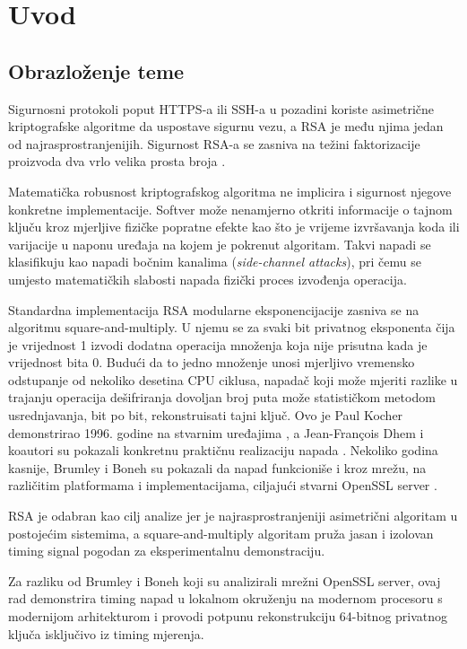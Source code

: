 
\chapter{Uvod}
\label{ch:uvod}

\section{Obrazloženje teme}
\label{sec:obrazlozenje}

Sigurnosni protokoli poput HTTPS-a ili SSH-a u pozadini koriste asimetrične kriptografske algoritme da uspostave sigurnu vezu, a RSA je među njima jedan od najrasprostranjenijih. Sigurnost RSA-a se zasniva na težini faktorizacije proizvoda dva vrlo velika prosta broja \cite{rivest1978}.

Matematička robusnost kriptografskog algoritma ne implicira i sigurnost njegove konkretne implementacije. Softver može nenamjerno otkriti informacije o tajnom ključu kroz mjerljive fizičke popratne efekte kao što je vrijeme izvršavanja koda ili varijacije u naponu uređaja na kojem je pokrenut algoritam. Takvi napadi se klasifikuju kao napadi bočnim kanalima (\textit{side-channel attacks}), pri čemu se umjesto matematičkih slabosti napada fizički proces izvođenja operacija.

Standardna implementacija RSA modularne eksponencijacije zasniva se na algoritmu square-and-multiply. U njemu se za svaki bit privatnog eksponenta čija je vrijednost 1 izvodi dodatna operacija množenja koja nije prisutna kada je vrijednost bita 0. Budući da to jedno množenje unosi mjerljivo vremensko odstupanje od nekoliko desetina CPU ciklusa, napadač koji može mjeriti razlike u trajanju operacija dešifriranja dovoljan broj puta može statističkom metodom usrednjavanja, bit po bit, rekonstruisati tajni ključ. Ovo je Paul Kocher demonstrirao 1996. godine na stvarnim uređajima \cite{kocher1996}, a Jean-François Dhem i koautori su pokazali konkretnu praktičnu realizaciju napada \cite{dhem1998}. Nekoliko godina kasnije, Brumley i Boneh su pokazali da napad funkcioniše i kroz mrežu, na različitim platformama i implementacijama, ciljajući stvarni OpenSSL server \cite{brumley2003}.

RSA je odabran kao cilj analize jer je najrasprostranjeniji asimetrični algoritam u postojećim sistemima, a square-and-multiply algoritam pruža jasan i izolovan timing signal pogodan za eksperimentalnu demonstraciju.

Za razliku od Brumley i Boneh koji su analizirali mrežni OpenSSL server, ovaj rad demonstrira timing napad u lokalnom okruženju na modernom procesoru s modernijom arhitekturom i provodi potpunu rekonstrukciju 64-bitnog privatnog ključa isključivo iz timing mjerenja.

